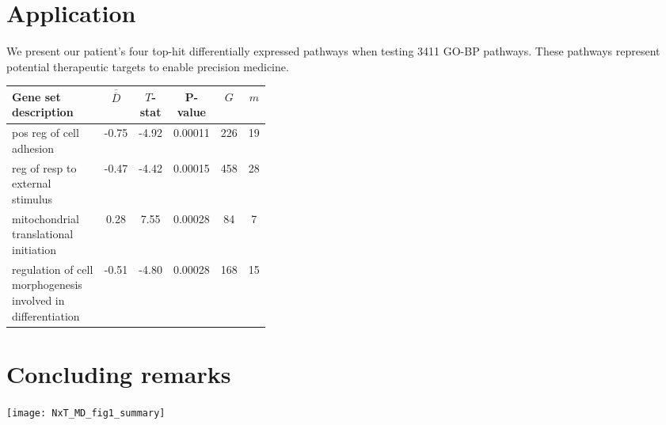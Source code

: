 \documentclass[a0,portrait]{a0poster}
\newcommand*{\barbar}[1]{\overline{\overline{#1}}}
\begin{document}
\begin{multicols}{3}
\section{Application}
We present our patient's four top-hit differentially expressed pathways when testing 3411 GO-BP pathways. These pathways represent potential therapeutic targets to enable precision medicine.

\begin{tabular} {>{\raggedright}p{0.375\linewidth} | c c c c c}
   Gene set description & $\barbar{D}$ & $T$-stat & P-value & $G$ & $m$ \\
    \hline \hline
   pos reg of cell adhesion & -0.75 & -4.92 & 0.00011 & 226 & 19 \\
   \hline
   reg of resp to external stimulus & -0.47 & -4.42 & 0.00015 & 458 & 28 \\
   \hline
   mitochondrial translational initiation & \phantom{-}0.28 & \phantom{-}7.55 & 0.00028 & 84 & 7 \\
   \hline
   regulation of cell morphogenesis involved in differentiation & -0.51 & -4.80 & 0.00028 & 168 & 15 \\
   \hline
   \end{tabular}


\color{Black} %

\section{Concluding remarks}

\begin{center}\vspace{1cm}
\texttt{[image: NxT\_MD\_fig1\_summary]}
\end{center}\vspace{1cm}


\end{multicols}
\end{document}

